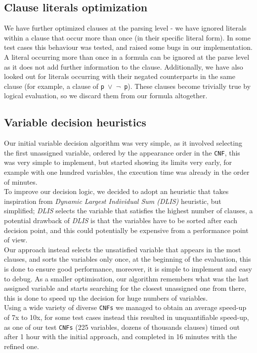 \documentclass[a4paper]{article}
\begin{document}
\subsection{Clause literals optimization}
We have further optimized clauses at the parsing level - we have ignored literals within a clause that occur more than once (in their specific literal form). In some test cases this behaviour was tested, and raised some bugs in our implementation. A literal occurring more than once in a formula can be ignored at the parse level as it does not add further information to the clause. Additionally, we have also looked out for literals occurring with their negated counterparts in the same clause (for example, a clause of \texttt{p $\vee$ $\neg$ p}). These clauses become trivially true by logical evaluation, so we discard them from our formula altogether.


\subsection{Variable decision heuristics}

Our initial variable decision algorithm was very simple, as it involved selecting the first unassigned variable, ordered by the appearance order in the \texttt{CNF}, this was very simple to implement, but started showing its limits very early, for example with one hundred variables, the execution time was already in the order of minutes. \\
To improve our decision logic, we decided to adopt an heuristic that takes inspiration from \emph{Dynamic Largest Individual Sum (DLIS)} heuristic, but simplified;
\emph{DLIS} selects the variable that satisfies the highest number of clauses, a potential drawback of \emph{DLIS} is that the variables have to be sorted after each decision point, and this could potentially be expensive from a performance point of view. \\
Our approach instead selects the unsatisfied variable that appears in the most clauses, and sorts the variables only once, at the beginning of the evaluation, this is done to ensure good performance, moreover, it is simple to implement and easy to debug.
As a smaller optimisation, our algorithm remembers what was the last assigned variable and starts searching for the closest unassigned one from there, this is done to speed up the decision for huge numbers of variables. \\
Using a wide variety of diverse \texttt{CNFs} we managed to obtain an average speed-up of 7x to 10x, for some test cases instead this resulted in unquantifiable speed-up, as one of our test \texttt{CNFs} (225 variables, dozens of thousands clauses) timed out after 1 hour with the initial approach, and completed in 16 minutes with the refined one.
\end{document}
